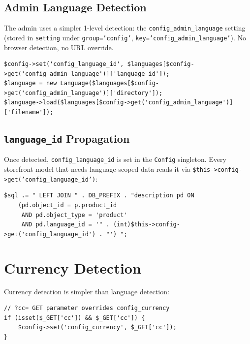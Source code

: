 \documentclass[11pt,a4paper]{article}
\begin{document}
\subsection{Admin Language Detection}

The admin uses a simpler 1-level detection: the
\texttt{config\_admin\_language} setting (stored in
\texttt{setting} under \texttt{group='config'},
\texttt{key='config\_admin\_language'}). No browser detection, no
URL override.

\begin{lstlisting}[caption={Admin language detection in \texttt{web/admin/index.php}.},label={lst:admin-lang}]
$config->set('config_language_id', $languages[$config->get('config_admin_language')]['language_id']);
$language = new Language($languages[$config->get('config_admin_language')]['directory']);
$language->load($languages[$config->get('config_admin_language')]['filename']);
\end{lstlisting}

\subsection{\texttt{language\_id} Propagation}

Once detected, \texttt{config\_language\_id} is set in the
\texttt{Config} singleton. Every storefront model that needs
language-scoped data reads it via
\texttt{\$this->config->get('config\_language\_id')}:

\begin{lstlisting}[caption={\texttt{language\_id} usage in the storefront product model.},label={lst:lang-id-usage}]
$sql .= " LEFT JOIN " . DB_PREFIX . "description pd ON
    (pd.object_id = p.product_id
     AND pd.object_type = 'product'
     AND pd.language_id = '" . (int)$this->config->get('config_language_id') . "') ";
\end{lstlisting}

\section{Currency Detection}\label{sec:currency}

Currency detection is simpler than language detection:

\begin{lstlisting}[caption={Currency detection in \texttt{app/shop/map.php}.},label={lst:currency-detection}]
// ?cc= GET parameter overrides config_currency
if (isset($_GET['cc']) && $_GET['cc']) {
    $config->set('config_currency', $_GET['cc']);
}
\end{lstlisting}
\end{document}
